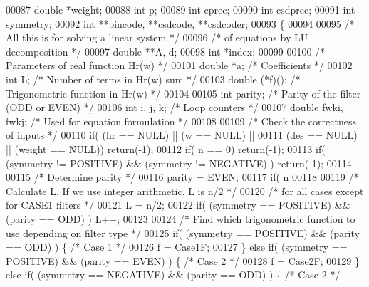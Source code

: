 \begin{DoxyCode}
00087 \textcolor{keywordtype}{double} *weight;
00088 \textcolor{keywordtype}{int} p;
00089 \textcolor{keywordtype}{int} cprec;
00090 \textcolor{keywordtype}{int} csdprec;
00091 \textcolor{keywordtype}{int} symmetry;
00092 \textcolor{keywordtype}{int} **bincode, **csdcode, **csdcoder;
00093 \{
00094 
00095     \textcolor{comment}{/* All this is for  solving a linear system */}
00096     \textcolor{comment}{/* of equations by LU decomposition */}
00097     \textcolor{keywordtype}{double} **A, d;
00098     \textcolor{keywordtype}{int} *index;
00099 
00100     \textcolor{comment}{/* Parameters of real function Hr(w) */}
00101     \textcolor{keywordtype}{double} *a;      \textcolor{comment}{/* Coefficients */}
00102     \textcolor{keywordtype}{int} L;          \textcolor{comment}{/* Number of terms in Hr(w) sum */}
00103     double (*f)();      \textcolor{comment}{/* Trigonometric function in Hr(w) */}
00104     
00105     \textcolor{keywordtype}{int} parity;     \textcolor{comment}{/* Parity of the filter (ODD or EVEN) */}
00106     \textcolor{keywordtype}{int} i, j, k;        \textcolor{comment}{/* Loop counters */}
00107     \textcolor{keywordtype}{double} fwki, fwkj;  \textcolor{comment}{/* Used for equation formulation */}
00108 
00109     \textcolor{comment}{/* Check the correctness of inputs */}
00110     \textcolor{keywordflow}{if}( (hr == NULL) || (w == NULL) || 
00111         (des == NULL) || (weight == NULL)) \textcolor{keywordflow}{return}(-1);
00112     \textcolor{keywordflow}{if}( n == 0) \textcolor{keywordflow}{return}(-1);
00113     \textcolor{keywordflow}{if}( (symmetry != POSITIVE) && (symmetry != NEGATIVE) ) \textcolor{keywordflow}{return}(-1);
00114 
00115     \textcolor{comment}{/* Determine parity */}
00116     parity = EVEN;
00117     \textcolor{keywordflow}{if}( n %
00118 
00119     \textcolor{comment}{/* Calculate L. If we use integer arithmetic, L is n/2 */}
00120     \textcolor{comment}{/* for all cases except for CASE1 filters */}
00121     L = n/2;
00122     \textcolor{keywordflow}{if}( (symmetry == POSITIVE) && (parity == ODD) ) L++;
00123 
00124     \textcolor{comment}{/* Find which trigonometric function to use depending on filter type */}
00125     \textcolor{keywordflow}{if}( (symmetry == POSITIVE) && (parity == ODD) ) \{       \textcolor{comment}{/* Case 1 */}
00126         f = Case1F; 
00127     \} \textcolor{keywordflow}{else} \textcolor{keywordflow}{if}( (symmetry == POSITIVE) && (parity == EVEN) ) \{   \textcolor{comment}{/* Case 2 */}
00128         f = Case2F;
00129     \} \textcolor{keywordflow}{else} \textcolor{keywordflow}{if}( (symmetry == NEGATIVE) && (parity == ODD) ) \{    \textcolor{comment}{/* Case 2 */}

\end{DoxyCode}
